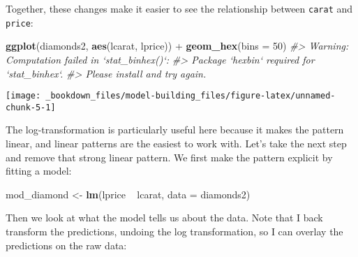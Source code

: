 \documentclass[]{book}
\newenvironment{Shaded}{\begin{snugshade}}{\end{snugshade}}
\newcommand{\KeywordTok}[1]{\textcolor[rgb]{0.13,0.29,0.53}{\textbf{{#1}}}}
\newcommand{\DataTypeTok}[1]{\textcolor[rgb]{0.13,0.29,0.53}{{#1}}}
\newcommand{\DecValTok}[1]{\textcolor[rgb]{0.00,0.00,0.81}{{#1}}}
\newcommand{\StringTok}[1]{\textcolor[rgb]{0.31,0.60,0.02}{{#1}}}
\newcommand{\CommentTok}[1]{\textcolor[rgb]{0.56,0.35,0.01}{\textit{{#1}}}}
\newcommand{\NormalTok}[1]{{#1}}
\begin{document}
Together, these changes make it easier to see the relationship between
\texttt{carat} and \texttt{price}:

\begin{Shaded}
\begin{Highlighting}[]
\KeywordTok{ggplot}\NormalTok{(diamonds2, }\KeywordTok{aes}\NormalTok{(lcarat, lprice)) +}\StringTok{ }
\StringTok{  }\KeywordTok{geom_hex}\NormalTok{(}\DataTypeTok{bins =} \DecValTok{50}\NormalTok{)}
\CommentTok{#> Warning: Computation failed in `stat_binhex()`:}
\CommentTok{#> Package `hexbin` required for `stat_binhex`.}
\CommentTok{#> Please install and try again.}
\end{Highlighting}
\end{Shaded}

\begin{center}\texttt{[image: \_bookdown\_files/model-building\_files/figure-latex/unnamed-chunk-5-1]} \end{center}

The log-transformation is particularly useful here because it makes the
pattern linear, and linear patterns are the easiest to work with. Let's
take the next step and remove that strong linear pattern. We first make
the pattern explicit by fitting a model:

\begin{Shaded}
\begin{Highlighting}[]
\NormalTok{mod_diamond <-}\StringTok{ }\KeywordTok{lm}\NormalTok{(lprice ~}\StringTok{ }\NormalTok{lcarat, }\DataTypeTok{data =} \NormalTok{diamonds2)}
\end{Highlighting}
\end{Shaded}

Then we look at what the model tells us about the data. Note that I back
transform the predictions, undoing the log transformation, so I can
overlay the predictions on the raw data:
\end{document}

